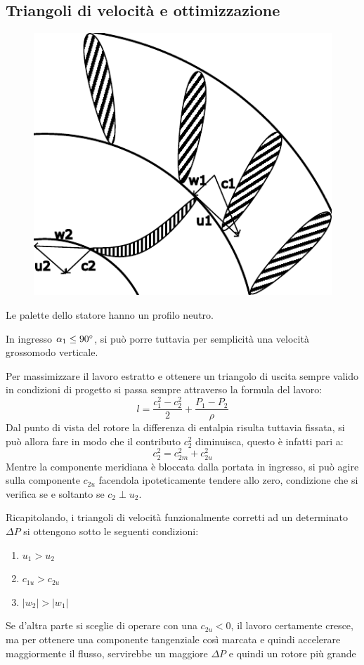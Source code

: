 \documentclass[a4paper, 15pt]{article}
\begin{document}
\subsection{Triangoli di velocità e ottimizzazione}
\begin{adjustwidth}{2in}{}
\begin{figure}[H]
	\centering
	\label{fig:francis2}
	\includegraphics[width=0.7\linewidth]{inkscape/Francis.pdf}
\end{figure}
	Le palette dello statore hanno un profilo neutro. \newline
	
	In ingresso $\alpha_1\leq90\degree$, si può porre tuttavia per semplicità una velocità grossomodo verticale. \newline 
	
	Per massimizzare il lavoro estratto e ottenere un triangolo di uscita sempre valido in condizioni di progetto si passa sempre attraverso la formula del lavoro:
	\[l = \dfrac{c_1^2-c_2^2}{2} + \dfrac{P_1-P_2}{\rho}\]	
	Dal punto di vista del rotore la differenza di entalpia risulta tuttavia fissata, si può allora fare in modo che il contributo $c_2^2$ diminuisca, questo è infatti pari a:
	\[c_2^2 = c_{2m}^2 + c_{2u}^2\]
	Mentre la componente meridiana è bloccata dalla portata in ingresso, si può agire sulla componente $c_{2u}$ facendola ipoteticamente tendere allo zero, condizione che si verifica se e soltanto se $c_2\perp u_2$. \newline 
	
	Ricapitolando, i triangoli di velocità funzionalmente corretti ad un determinato $\Delta P$ si ottengono sotto le seguenti condizioni:
	\begin{enumerate}
		\item \(u_1>u_2\)
		\item \(c_{1u}>c_{2u}\)
		\item \(|w_2|>|w_1|\)
	\end{enumerate}
	Se d'altra parte si sceglie di operare con una $c_{2u}<0$, il lavoro certamente cresce, ma per ottenere una componente tangenziale così marcata e quindi accelerare maggiormente il flusso, servirebbe un maggiore $\Delta P$ e quindi un rotore più grande 
\end{adjustwidth}
		
\end{document}
